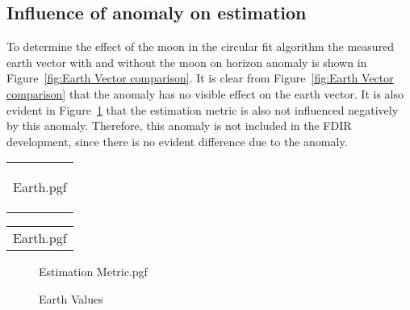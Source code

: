 \subsection{Influence of anomaly on estimation}
To determine the effect of the moon in the circular fit algorithm the measured earth vector with and without the moon on horizon anomaly is shown in Figure~\ref{fig:Earth Vector comparison}. It is clear from Figure~\ref{fig:Earth Vector comparison} that the anomaly has no visible effect on the earth vector. It is also evident in Figure~\ref{fig:Moon On Horizon Estimation Metric} that the estimation metric is also not influenced negatively by this anomaly. Therefore, this anomaly is not included in the FDIR development, since there is no evident difference due to the anomaly.
\begin{figure*}[!htb]
	\begin{tabular}{@{}c@{}}
	\centering

	{Earth.pgf}
	
	\label{fig:Earth Vector comparison with moon on the horizon}
	\end{tabular}
	\begin{tabular}{@{}c@{}}
		\centering
		{Earth.pgf} 
		\label{fig:Sun Vector comparison without moon on the horizon}
	\end{tabular}
	
	\caption{Comparison of Earth Vector with and without moon on the horizon}
	\label{fig:Earth Vector comparison}
	
\end{figure*}

\begin{figure}[!htb]
	\centering
	
	{Estimation Metric.pgf}
	
	\caption{Earth Values}
	\label{fig:Moon On Horizon Estimation Metric}
\end{figure}



